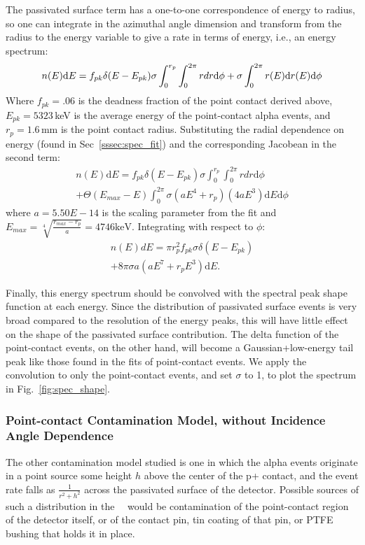 The passivated surface term has a one-to-one correspondence of energy to radius, so one can integrate in the azimuthal angle dimension and transform from the radius to the energy variable to give a rate in terms of energy, i.e., an energy spectrum:
$$n(E)\mathrm{d}E =  f_{pk}\delta(E-E_{pk})\sigma \int_{0}^{r_p} \int_{0}^{2\pi}r{d}r \mathrm{d}\phi \\
+ \sigma \int_{0}^{2\pi}r(E)\mathrm{d}r(E) \mathrm{d}\phi 
$$
Where $f_{pk} = .06$ is the deadness fraction of the point contact derived above, $E_{pk}= 5323$\,keV is the average energy of the point-contact alpha events, and $r_p = 1.6$\,mm is the point contact radius. Substituting the radial dependence on energy (found in Sec~\ref{sssec:spec_fit}) and the corresponding Jacobean in the second term:
\begin{equation}
\begin{split}
n(E)\mathrm{d}E = f_{pk}\delta(E-E_{pk})\sigma \int_{0}^{r_p} \int_{0}^{2\pi}r{d}r \mathrm{d}\phi \\
+  \Theta(E_{max}-E)\int_{0}^{2\pi}\sigma(aE^4 + r_p)(4aE^3)\mathrm{d}E \mathrm{d}\phi
\end{split}
\end{equation}
\vspace{1cm}
where $a = 5.50E-14$ is the scaling parameter from the fit and $E_{max} = \sqrt[4]{\frac{r_{max}-r_p}{a}} = 4746\mathrm{keV}$. 
Integrating with respect to $\phi$:
\begin{equation}
\begin{split}
n(E)dE = \pi r_p^2 f_{pk}\sigma\delta(E-E_{pk}) \\
+ 8\pi \sigma a (aE^7 + r_pE^3) \mathrm{d}E.
\end{split}
\end{equation}

Finally, this energy spectrum should be convolved with the spectral peak shape function at each energy. Since the distribution of passivated surface events is very broad compared to the resolution of the energy peaks, this will have little effect on the shape of the passivated surface contribution. The delta function of the point-contact events, on the other hand, will become a Gaussian+low-energy tail peak like those found in the fits of point-contact events. We apply the convolution to only the point-contact events, and set $\sigma$ to 1, to plot the spectrum in Fig.~\ref{fig:spec_shape}.
 
\subsubsection{Point-contact Contamination Model, without Incidence Angle Dependence}\label{sssec:point_model_noAngle}
The other contamination model studied is one in which the alpha events originate in a point source some height $h$ above the center of the p+ contact, and the event rate falls as $\frac{1}{r^2+h^2}$ across the passivated surface of the detector. Possible sources of such a distribution in the \MJ\ \DEM\ would be contamination of the point-contact region of the detector itself, or of the contact pin, tin coating of that pin, or PTFE bushing that holds it in place. 


